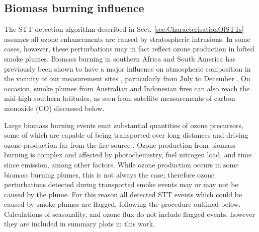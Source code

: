 \documentclass[acp, manuscript]{copernicus} %
\begin{document}
  \subsection{Biomass burning influence}
  \label{sec:BiomassBurning}
    The STT detection algorithm described in Sect. \ref{sec:CharacterisationOfSTTs} assumes all ozone enhancements are caused by stratospheric intrusions.
    In some cases, however, these perturbations may in fact reflect ozone production in lofted smoke plumes.
    Biomass burning in southern Africa and South America has previously been shown to have a major influence on atmospheric composition in the vicinity of our measurement sites \citep{Oltmans2001, Gloudemans2006, Edwards2006}, particularly from July to December \citep{Pak2003, Liu2017}.
    On occasion, smoke plumes from Australian and Indonesian fires can also reach the mid-high southern latitudes, as seen from satellite measurements of carbon monoxide (CO) discussed below. %
    
    Large biomass burning events emit substantial quantities of ozone precursors, some of which are capable of being transported over long distances and driving ozone production far from the fire source \citep{Jaffe2012}.
    Ozone production from biomass burning is complex and affected by photochemistry, fuel nitrogen load, and time since emission, among other factors. 
    While ozone production occurs in some biomass burning plumes, this is not always the case; therefore ozone perturbations detected during transported smoke events may or may not be caused by the plume.
    For this reason all detected STT events which could be caused by smoke plumes are flagged, following the procedure outlined below.
    Calculations of seasonality, and ozone flux do not include flagged events, however they are included in summary plots in this work.
    
    
\end{document}
